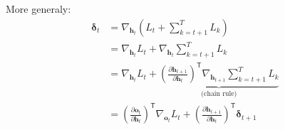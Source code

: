 \begin{notechapter}
More generaly:
\begin{align*}
    \bm{\delta}_t &= \nabla_{\mathbf{h}_t} \left( L_t + \sum_{k=t+1}^{T} L_k \right) \\
    &= \nabla_{\mathbf{h}_t} L_t + \nabla_{\mathbf{h}_t} \sum_{k=t+1}^{T} L_k \\
    &= \nabla_{\mathbf{h}_t} L_t +
    \underbrace{\left(\frac{\partial \mathbf{h}_{t+1}}{\partial \mathbf{h}_t}\right)^\mathsf{T} 
    \nabla_{\mathbf{h}_{t+1}} \sum_{k=t+1}^{T} L_k}_{\text{(chain rule)}} \\
    &= \left(\frac{\partial \mathbf{o}_t}{\partial \mathbf{h}_t}\right)^\mathsf{T}
    \nabla_{\mathbf{o}_t} L_t + \left(\frac{\partial \mathbf{h}_{t+1}}{\partial
    \mathbf{h}_t}\right)^\mathsf{T} \bm{\delta}_{t+1}
\end{align*}


\end{notechapter}
